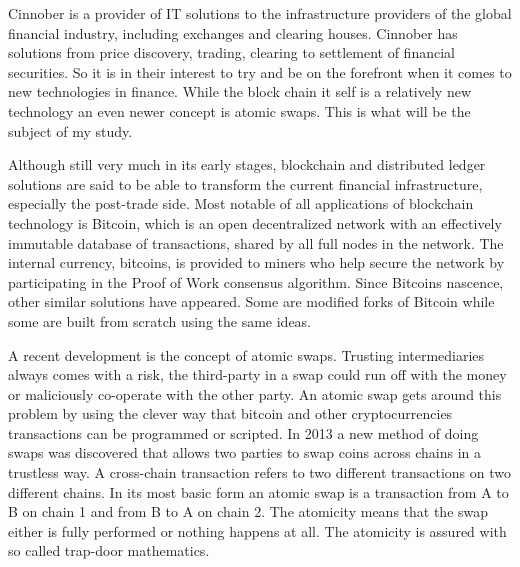 Cinnober is a provider of IT solutions to the infrastructure providers of the
global financial industry, including exchanges and clearing houses.  Cinnober
has solutions from price discovery, trading, clearing to settlement of financial
securities. So it is in their interest to try and be on the forefront when it comes to new technologies in finance. While the block chain it self is a relatively new technology an even newer concept is atomic swaps. This is what will be the subject of my study. 

Although still very much in its early stages, blockchain and distributed
ledger  solutions  are  said  to  be  able  to  transform  the  current  financial  infrastructure, especially the post-trade side.  Most notable of all applications of blockchain technology is Bitcoin, which is an open decentralized network with  an  effectively  immutable  database  of  transactions,  shared by all  full nodes in the network.  The internal currency, bitcoins, is provided to miners who help secure the network by participating in the Proof of Work consensus
algorithm.  Since Bitcoins nascence, other similar solutions have appeared.
Some are modified forks of Bitcoin while some are built from scratch using
the same ideas.

A recent development is the concept of atomic swaps.  Trusting intermediaries always comes with a risk, the third-party in a swap could run off with
the money or maliciously co-operate with the other party.  An atomic swap
gets  around  this  problem  by  using  the  clever  way  that  bitcoin  and  other cryptocurrencies  transactions  can  be  programmed  or  scripted. In 2013 a new method of doing swaps was discovered that allows two parties to swap coins across chains in a trustless way.  A cross-chain transaction refers to two  different  transactions  on  two  different  chains.   In  its  most  basic  form
an atomic swap is a transaction from A to B on chain 1 and from B to A
on chain 2.  The atomicity means that the swap either is fully performed or
nothing happens at all.  The atomicity is assured with so called trap-door
mathematics.

